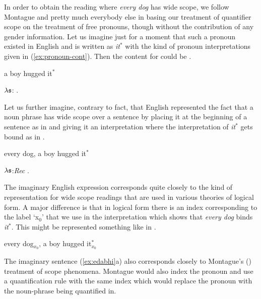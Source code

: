 In order to obtain the reading where \textit{every dog} has wide
scope, we follow Montague and pretty much everybody else in basing our
treatment of quantifier scope on the treatment of free pronouns,
though without the contribution of any gender information.  Let us
imagine just for a moment that such a pronoun existed in English and
is written as \textit{it$^*$} with the kind of pronoun interpretations
given in (\ref{ex:pronoun-cont}).  Then the content for  could be
.
\begin{ex} 
\begin{subex} 
 
\item a boy hugged it$^*$
 
\item $\lambda \frak{s}$: . 
 
\end{subex} 
   
\end{ex}
Let us further imagine, contrary to fact, that English represented the fact
that a noun phrase has wide scope over a sentence by placing it at the
beginning of a sentence as in  and giving it an
interpretation where the interpretation of \textit{it$^*$} gets bound
as in .
\begin{ex} 
\begin{subex} 
 
\item every dog, a boy hugged it$^*$ 
 
\item $\lambda\frak{s}$:\textit{Rec} . 
 
\end{subex} 
\label{ex:edabhi}   
\end{ex} 
The imaginary English expression  corresponds quite closely
to the kind of representation for wide scope readings that are used in
various theories of logical form.  A major difference is that in
logical form there is an index corresponding to the label `x$_0$' that
we use in the interpretation which shows that \textit{every dog} binds
\textit{it$^*$}.  This might be represented something like in
\nexteg{}.
\begin{ex} 
every dog$_{x_0}$, a boy hugged it$^*_{x_0}$ 
\end{ex} 
The imaginary sentence (\ref{ex:edabhi}a) also corresponds closely to
Montague's (\citeyear{Montague1973}) treatment of scope phenomena.
Montague would also index the pronoun and use a quantification rule
with the same index which would replace the pronoun with the
noun-phrase being quantified in.

